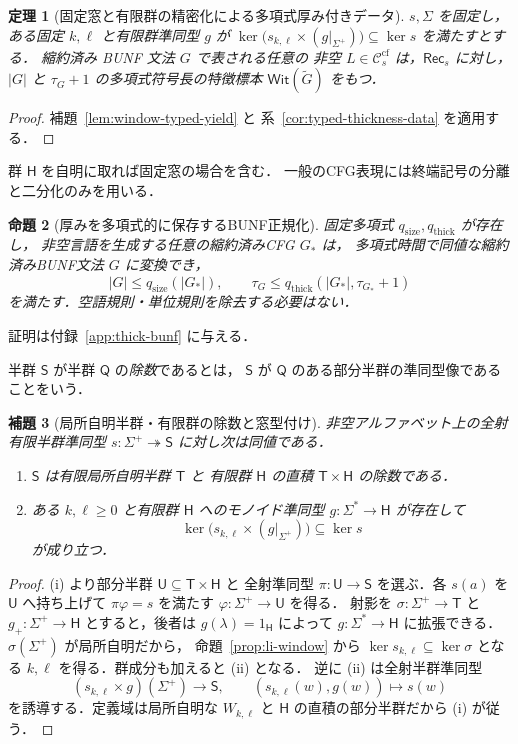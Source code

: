 \documentclass[11pt,a4paper]{ltjsarticle}
\newtheorem{theorem}{定理}[section]
\newtheorem{lemma}[theorem]{補題}
\newtheorem{proposition}[theorem]{命題}
\theoremstyle{remark}
\theoremstyle{plain}
\newcommand{\WitnessSet}{\mathsf{Wit}}
\newcommand{\cf}{\mathrm{cf}}
\newcommand{\Ccf}[1]{\mathcal C_{#1}^{\cf}}
\begin{document}
\begin{theorem}[固定窓と有限群の精密化による多項式厚み付きデータ]
\label{thm:window-thick}
$s,\Sigma$ を固定し，ある固定 $k,\ell$ と有限群準同型 $g$ が
$\ker\bigl(s_{k,\ell}\times(g|_{\Sigma^+})\bigr)
 \subseteq\ker s$ を満たすとする．
縮約済み BUNF 文法 $G$ で表される任意の
非空 $L\in\Ccf{s}$ は，$\mathsf{Rec}_s$ に対し，
$|G|$ と $\tau_G+1$ の多項式符号長の特徴標本
$\WitnessSet(\widetilde G)$ をもつ．
\end{theorem}
\begin{proof}
補題~\ref{lem:window-typed-yield} と
系~\ref{cor:typed-thickness-data} を適用する．
\end{proof}

群 $\mathsf H$ を自明に取れば固定窓の場合を含む．
一般のCFG表現には終端記号の分離と二分化のみを用いる．

\begin{proposition}[厚みを多項式的に保存するBUNF正規化]
\label{prop:thick-bunf-normal}
固定多項式 $q_{\mathrm{size}},q_{\mathrm{thick}}$ が存在し，
非空言語を生成する任意の縮約済みCFG $G_*$ は，
多項式時間で同値な縮約済みBUNF文法 $G$ に変換でき，
\[
 |G|\le q_{\mathrm{size}}(|G_*|),\qquad
 \tau_G\le q_{\mathrm{thick}}(|G_*|,\tau_{G_*}+1)
\]
を満たす．空語規則・単位規則を除去する必要はない．
\end{proposition}
証明は付録~\ref{app:thick-bunf} に与える．

半群 $\mathsf S$ が半群 $\mathsf Q$ の\emph{除数}であるとは，
$\mathsf S$ が $\mathsf Q$ のある部分半群の準同型像であることをいう．

\begin{lemma}[局所自明半群・有限群の除数と窓型付け]
\label{lem:li-group-factor}
非空アルファベット上の全射有限半群準同型
$s:\Sigma^+\twoheadrightarrow\mathsf S$ に対し次は同値である．
\begin{enumerate}[label=\textup{(\roman*)},nosep]
\item $\mathsf S$ は有限局所自明半群 $\mathsf T$ と
有限群 $\mathsf H$ の直積 $\mathsf T\times\mathsf H$ の除数である．
\item ある $k,\ell\ge0$ と有限群 $\mathsf H$ へのモノイド準同型
$g:\Sigma^*\to\mathsf H$ が存在して
\[
\ker\bigl(s_{k,\ell}\times(g|_{\Sigma^+})\bigr)
\subseteq\ker s
\]
が成り立つ．
\end{enumerate}
\end{lemma}
\begin{proof}
(i) より部分半群 $\mathsf U\subseteq\mathsf T\times\mathsf H$ と
全射準同型 $\pi:\mathsf U\to\mathsf S$ を選ぶ．各 $s(a)$ を
$\mathsf U$ へ持ち上げて $\pi\varphi=s$ を満たす
$\varphi:\Sigma^+\to\mathsf U$ を得る．
射影を $\sigma:\Sigma^+\to\mathsf T$ と
$g_+:\Sigma^+\to\mathsf H$ とすると，後者は
$g(\lambda)=1_{\mathsf H}$ によって
$g:\Sigma^*\to\mathsf H$ に拡張できる．
$\sigma(\Sigma^+)$ が局所自明だから，
命題~\ref{prop:li-window} から
$\ker s_{k,\ell}\subseteq\ker\sigma$ となる
$k,\ell$ を得る．群成分も加えると (ii) となる．
逆に (ii) は全射半群準同型
\[
(s_{k,\ell}\times g)(\Sigma^+)\longrightarrow\mathsf S,
\qquad(s_{k,\ell}(w),g(w))\longmapsto s(w)
\]
を誘導する．定義域は局所自明な $W_{k,\ell}$ と
$\mathsf H$ の直積の部分半群だから (i) が従う．
\end{proof}
\end{document}

